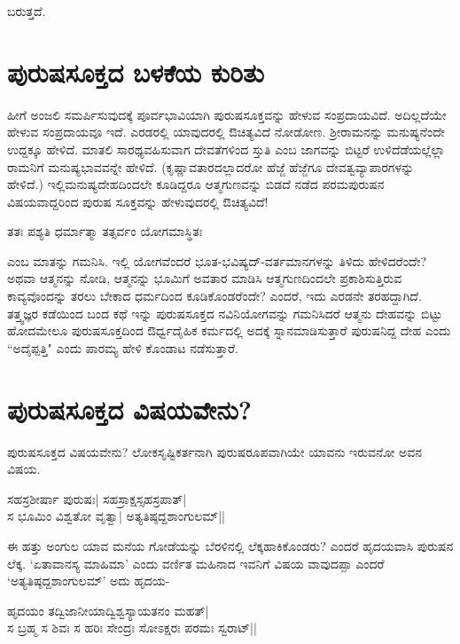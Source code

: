 ಬರುತ್ತದೆ.

\section*{ಪುರುಷಸೂಕ್ತದ ಬಳಕೆಯ ಕುರಿತು}

ಹೀಗೆ ಅಂಜಲಿ ಸಮರ್ಪಿಸುವುದಕ್ಕೆ ಪೂರ್ವಭಾವಿಯಾಗಿ ಪುರುಷಸೂಕ್ತವನ್ನು ಹೇಳುವ ಸಂಪ್ರದಾಯವಿದೆ. ಅದಿಲ್ಲದೆಯೇ ಹೇಳುವ ಸಂಪ್ರದಾಯವೂ ಇದೆ. ಎರಡರಲ್ಲಿ ಯಾವುದರಲ್ಲಿ ಔಚಿತ್ಯವಿದೆ ನೋಡೋಣ. ಶ್ರೀರಾಮನನ್ನು ಮನುಷ್ಯನೆಂದೇ ಉದ್ದಕ್ಕೂ ಹೇಳಿದೆ. ಮಾತಲಿ ಸಾರಥ್ಯವಹಿಸುವಾಗ ದೇವತೆಗಳಿಂದ ಸ್ತುತಿ ಎಂಬ ಜಾಗವನ್ನು ಬಿಟ್ಟರೆ ಉಳಿದೆಡೆಯಲ್ಲೆಲ್ಲಾ ರಾಮನಿಗೆ ಮನುಷ್ಯಭಾವವನ್ನೇ ಹೇಳಿದೆ. (ಕೃಷ್ಣಾವತಾರದಲ್ಲಾದರೋ ಹೆಜ್ಜೆ ಹೆಜ್ಜೆಗೂ ದೇವತ್ವವ್ಯಾಪಾರಗಳನ್ನು ಹೇಳಿದೆ.) ಇಲ್ಲಿಮನುಷ್ಯದೇಹದಿಂದಲೇ ಕೂಡಿದ್ದರೂ ಆತ್ಮಗುಣವನ್ನು ಬಿಡದೆ ನಡೆದ ಪರಮಪುರುಷನ ವಿಷಯವಾದ್ದರಿಂದ ಪುರುಷ ಸೂಕ್ತವನ್ನು ಹೇಳುವುದರಲ್ಲಿ ಔಚಿತ್ಯವಿದೆ!

\begin{shloka}
ತತಃ ಪಶ್ಯತಿ ಧರ್ಮಾತ್ಮಾ ತತ್ಸರ್ವಂ ಯೋಗಮಾಸ್ಥಿತಃ
\end{shloka}

ಎಂಬ ಮಾತನ್ನು ಗಮನಿಸಿ. ಇಲ್ಲಿ ಯೋಗವೆಂದರೆ ಭೂತ-ಭವಿಷ್ಯದ್-ವರ್ತಮಾನಗಳನ್ನು ತಿಳಿದು ಹೇಳಿದರೆಂದೇ? ಅಥವಾ ಆತ್ಮನನ್ನು ನೋಡಿ, ಆತ್ಮನನ್ನು ಭೂಮಿಗೆ ಅವತಾರ ಮಾಡಿಸಿ ಆತ್ಮಗುಣದಿಂದಲೇ ಪ್ರಕಾಶಿಸುತ್ತಿರುವ ಕಾವ್ಯವೊಂದನ್ನು ತರಲು ಬೇಕಾದ ಧರ್ಮದಿಂದ ಕೂಡಿಕೊಂಡರೆಂದೇ? ಎಂದರೆ, ಇದು ಎರಡನೇ ತರಹದ್ದಾಗಿದೆ. ತತ್ತ್ವಜ್ಞರ ಕಡೆಯಿಂದ ಬಂದ ಕಥೆ ಇನ್ನು ಪುರುಷಸೂಕ್ತದ ನವಿನಿಯೋಗವನ್ನು ಗಮನಿಸಿದರೆ ಆತ್ಮನು ದೇಹವನ್ನು ಬಿಟ್ಟು ಹೋದಮೇಲೂ ಪುರುಷಸೂಕ್ತದಿಂದ ಔರ್ಧ್ವದೈಹಿಕ ಕರ್ಮದಲ್ಲಿ ಅದಕ್ಕೆ ಸ್ನಾನಮಾಡಿಸುತ್ತಾರೆ ಪುರುಷನಿದ್ದ ದೇಹ ಎಂದು ``ಅದೈಪ್ಪತ್ತಿ" ಎಂದು ಪಾರಮ್ಯ ಹೇಳಿ ಕೊಂಡಾಟ ನಡೆಸುತ್ತಾರೆ. 

\section*{ಪುರುಷಸೂಕ್ತದ ವಿಷಯವೇನು?}

ಪುರುಷಸೂಕ್ತದ ವಿಷಯವೇನು? ಲೋಕಸೃಷ್ಟಿಕರ್ತನಾಗಿ ಪುರುಷರೂಪವಾಗಿಯೇ ಯಾವನು ಇರುವನೋ ಅವನ ವಿಷಯ. 

\begin{shloka}
ಸಹಸ್ರಶೀರ್ಷಾ ಪುರುಷಃ| ಸಹಸ್ರಾಕ್ಷಸ್ಸಹಸ್ರಪಾತ್|\\
ಸ ಭೂಮಿಂ ವಿಶ್ವತೋ ವೃತ್ವಾ| ಅತ್ಯತಿಷ್ಠದ್ದಶಾಂಗುಲಮ್||
\end{shloka}

ಈ ಹತ್ತು ಅಂಗುಲ ಯಾವ ಮನೆಯ ಗೋಡೆಯನ್ನು ಬೆರಳಿನಲ್ಲಿ ಲೆಕ್ಕಹಾಕಿಕೊಂಡರು? ಎಂದರೆ ಹೃದಯವಾಸಿ ಪುರುಷನ ಲೆಕ್ಕ. `ಏತಾವಾನಸ್ಯ ಮಾಹಿಮಾ' ಎಂದು ವರ್ಣಿತ ಮಹಿನಾದ ಇವನಿಗೆ ವಿಷಯ ವಾವುದಪ್ಪಾ ಎಂದರೆ `ಅತ್ಯತಿಷ್ಠದ್ದಶಾಂಗುಲಮ್' ಅದು ಹೃದಯ-

\begin{shloka}
ಹೃದಯಂ ತದ್ವಿಜಾನೀಯಾದ್ವಿಶ್ವಸ್ಯಾಯತನಂ ಮಹತ್|\\
ಸ ಬ್ರಹ್ಮ ಸ ಶಿವಃ ಸ ಹರಿಃ ಸೇಂದ್ರಃ ಸೋಽಕ್ಷರಃ ಪರಮಃ ಸ್ವರಾಟ್||
\end{shloka}


